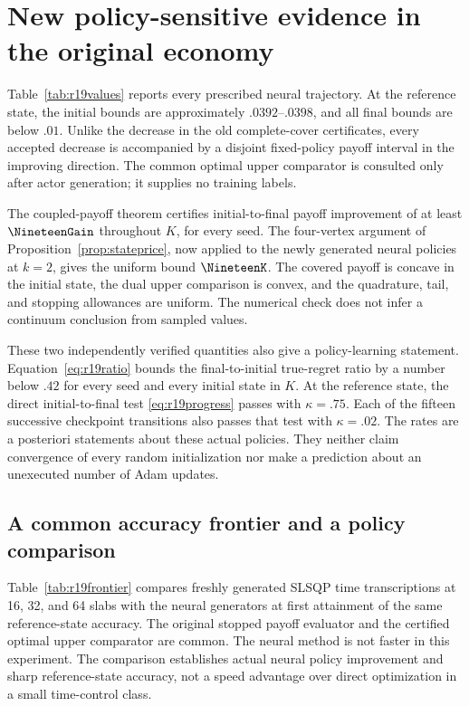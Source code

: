 \section{New policy-sensitive evidence in the original economy}\label{sec:r19results}
Table~\ref{tab:r19values} reports every prescribed neural trajectory. At the reference state, the initial bounds are approximately $.0392$--$.0398$, and all final bounds are below $.01$. Unlike the decrease in the old complete-cover certificates, every accepted decrease is accompanied by a disjoint fixed-policy payoff interval in the improving direction. The common optimal upper comparator is consulted only after actor generation; it supplies no training labels.


The coupled-payoff theorem certifies initial-to-final payoff improvement of at least $\NineteenGain$ throughout $K$, for every seed. The four-vertex argument of Proposition~\ref{prop:stateprice}, now applied to the newly generated neural policies at $k=2$, gives the uniform bound $\NineteenK$. The covered payoff is concave in the initial state, the dual upper comparison is convex, and the quadrature, tail, and stopping allowances are uniform. The numerical check does not infer a continuum conclusion from sampled values.

These two independently verified quantities also give a policy-learning statement. Equation~\eqref{eq:r19ratio} bounds the final-to-initial true-regret ratio by a number below $.42$ for every seed and every initial state in $K$. At the reference state, the direct initial-to-final test \eqref{eq:r19progress} passes with $\kappa=.75$. Each of the fifteen successive checkpoint transitions also passes that test with $\kappa=.02$. The rates are a posteriori statements about these actual policies. They neither claim convergence of every random initialization nor make a prediction about an unexecuted number of Adam updates.

\subsection{A common accuracy frontier and a policy comparison}
Table~\ref{tab:r19frontier} compares freshly generated SLSQP time transcriptions at 16, 32, and 64 slabs with the neural generators at first attainment of the same reference-state accuracy. The original stopped payoff evaluator and the certified optimal upper comparator are common. The neural method is not faster in this experiment. The comparison establishes actual neural policy improvement and sharp reference-state accuracy, not a speed advantage over direct optimization in a small time-control class.


